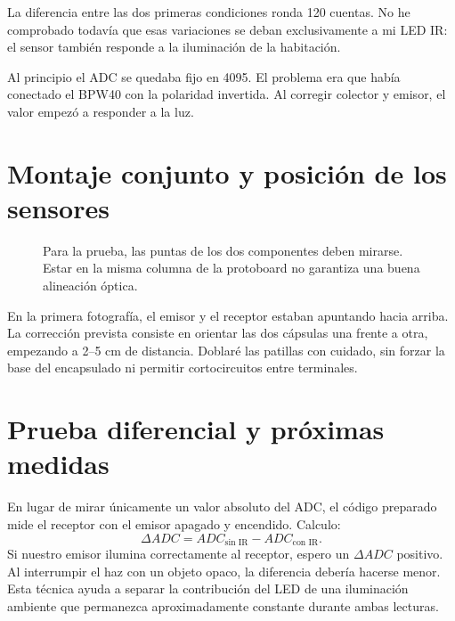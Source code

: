 \documentclass[11pt,a4paper]{article}
\begin{document}
La diferencia entre las dos primeras condiciones ronda 120 cuentas. No he comprobado todavía que esas variaciones se deban exclusivamente a mi LED IR: el sensor también responde a la iluminación de la habitación.

Al principio el ADC se quedaba fijo en 4095. El problema era que había conectado el BPW40 con la polaridad invertida. Al corregir colector y emisor, el valor empezó a responder a la luz.

\section{Montaje conjunto y posición de los sensores}

\begin{figure}[H]
\centering
{}
\caption{Para la prueba, las puntas de los dos componentes deben mirarse. Estar en la misma columna de la protoboard no garantiza una buena alineación óptica.}
\end{figure}

En la primera fotografía, el emisor y el receptor estaban apuntando hacia arriba. La corrección prevista consiste en orientar las dos cápsulas una frente a otra, empezando a 2--5 cm de distancia. Doblaré las patillas con cuidado, sin forzar la base del encapsulado ni permitir cortocircuitos entre terminales.

\section{Prueba diferencial y próximas medidas}
En lugar de mirar únicamente un valor absoluto del ADC, el código preparado mide el receptor con el emisor apagado y encendido. Calculo:
\begin{equation}
\Delta ADC=ADC_{\text{sin IR}}-ADC_{\text{con IR}}.
\end{equation}
Si nuestro emisor ilumina correctamente al receptor, espero un $\Delta ADC$ positivo. Al interrumpir el haz con un objeto opaco, la diferencia debería hacerse menor. Esta técnica ayuda a separar la contribución del LED de una iluminación ambiente que permanezca aproximadamente constante durante ambas lecturas.
\end{document}

